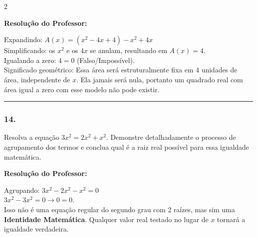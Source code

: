 \begin{multicols*}{2}
\ifgabarito
    \begin{tcolorbox}[colback=CorTitUm!5, colframe=CorTitUm, boxrule=1pt, arc=4pt, left=6pt, right=6pt, top=6pt, bottom=6pt]
    \small\textbf{\textcolor{CorTitUm}{Resolução do Professor:}}\par\vspace{0.1cm}
    \color{CinzaEscuro}
    Expandindo: $A(x) = (x^2 - 4x + 4) - x^2 + 4x$\\
    Simplificando: os $x^2$ e os $4x$ se anulam, resultando em $A(x) = 4$.\\
    Igualando a zero: $4 = 0$ (Falso/Impossível).\\
    Significado geométrico: Essa área será estruturalmente fixa em 4 unidades de área, independente de $x$. Ela jamais será nula, portanto um quadrado real com área igual a zero com esse modelo não pode existir.
    \end{tcolorbox}
\fi

\par\vspace{\espacoQuestao}

\noindent\textcolor{CorLinha}{\rule{\linewidth}{0.5pt}} 
\par\vspace{\espacoPreQuestao}
\subsubsection*{14.} Resolva a equação $ 3x^2 = 2x^2 + x^2 $. Demonstre detalhadamente o processo de agrupamento dos termos e conclua qual é a raiz real possível para essa igualdade matemática.

\ifgabarito
    \begin{tcolorbox}[colback=CorTitUm!5, colframe=CorTitUm, boxrule=1pt, arc=4pt, left=6pt, right=6pt, top=6pt, bottom=6pt]
    \small\textbf{\textcolor{CorTitUm}{Resolução do Professor:}}\par\vspace{0.1cm}
    \color{CinzaEscuro}
    Agrupando: $3x^2 - 2x^2 - x^2 = 0$\\
    $3x^2 - 3x^2 = 0 \rightarrow 0 = 0$.\\
    Isso não é uma equação regular do segundo grau com 2 raízes, mas sim uma \textbf{Identidade Matemática}. Qualquer valor real testado no lugar de $x$ tornará a igualdade verdadeira.
    \end{tcolorbox}
\fi

\par\vspace{\espacoQuestao}


\end{multicols*}
